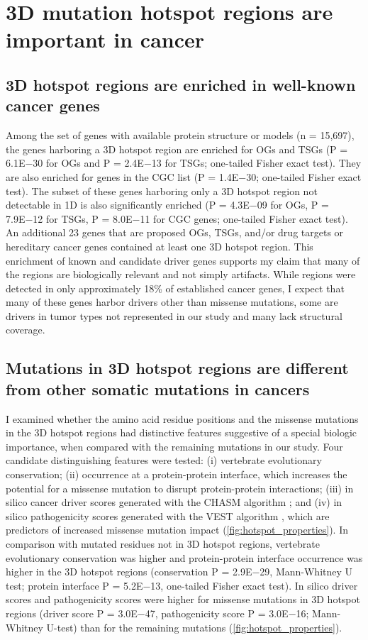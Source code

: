 \section{3D mutation hotspot regions are important in cancer}

\subsection{3D hotspot regions are enriched in well-known cancer genes}

Among the set of genes with available protein structure or models (n = 15,697), the genes harboring a 3D hotspot region are enriched for OGs and TSGs (P = 6.1E−30 for OGs and P = 2.4E−13 for TSGs; one-tailed Fisher exact test). They are also enriched for genes in the CGC list (P = 1.4E−30; one-tailed Fisher exact test). The subset of these genes harboring only a 3D hotspot region not detectable in 1D is also significantly enriched (P = 4.3E−09 for OGs, P = 7.9E−12 for TSGs, P = 8.0E−11 for CGC genes; one-tailed Fisher exact test). An additional 23 genes that are proposed OGs, TSGs, and/or drug targets or hereditary cancer genes contained at least one 3D hotspot region. This enrichment of known and candidate driver genes supports my claim that many of the regions are biologically relevant and not simply artifacts. While regions were detected in only approximately 18\% of established cancer genes, I expect that many of these genes harbor drivers other than missense mutations, some are drivers in tumor types not represented in our study and many lack structural coverage.

\subsection{Mutations in 3D hotspot regions are different from other somatic mutations in cancers}

I examined whether the amino acid residue positions and the missense mutations in the 3D hotspot regions had distinctive features suggestive of a special biologic importance, when compared with the remaining mutations in our study. Four candidate distinguishing features were tested: (i) vertebrate evolutionary conservation; (ii) occurrence at a protein-protein interface, which increases the potential for a missense mutation to disrupt protein-protein interactions; (iii) in silico cancer driver scores generated with the CHASM algorithm \cite{RN29}; and (iv) in silico pathogenicity scores generated with the VEST algorithm \cite{RN30}, which are predictors of increased missense mutation impact (\autoref{fig:hotspot_properties}). In comparison with mutated residues not in 3D hotspot regions, vertebrate evolutionary conservation was higher and protein-protein interface occurrence was higher in the 3D hotspot regions (conservation P = 2.9E−29, Mann-Whitney U test; protein interface P = 5.2E−13, one-tailed Fisher exact test). In silico driver scores and pathogenicity scores were higher for missense mutations in 3D hotspot regions (driver score P = 3.0E−47, pathogenicity score P = 3.0E−16; Mann-Whitney U-test) than for the remaining mutations (\autoref{fig:hotspot_properties}).

